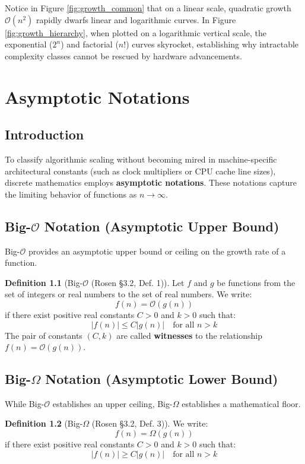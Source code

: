 \documentclass[11pt,a4paper,oneside]{report}
\theoremstyle{definition}
\newtheorem{definition}{Definition}[chapter]
\begin{document}
Notice in Figure \ref{fig:growth_common} that on a linear scale, quadratic growth $\mathcal{O}(n^2)$ rapidly dwarfs linear and logarithmic curves. In Figure \ref{fig:growth_hierarchy}, when plotted on a logarithmic vertical scale, the exponential ($2^n$) and factorial ($n!$) curves skyrocket, establishing why intractable complexity classes cannot be rescued by hardware advancements.

\chapter{Asymptotic Notations}
\label{chap:asymptotic}

\section{Introduction}
To classify algorithmic scaling without becoming mired in machine-specific architectural constants (such as clock multipliers or CPU cache line sizes), discrete mathematics employs \textbf{asymptotic notations}. These notations capture the limiting behavior of functions as $n \to \infty$.

\section{Big-$\mathcal{O}$ Notation (Asymptotic Upper Bound)}
Big-$\mathcal{O}$ provides an asymptotic upper bound or ceiling on the growth rate of a function.

\begin{definition}[Big-$\mathcal{O}$ (Rosen §3.2, Def. 1)]
Let $f$ and $g$ be functions from the set of integers or real numbers to the set of real numbers. We write:
$$f(n) = \mathcal{O}(g(n))$$
if there exist positive real constants $C > 0$ and $k > 0$ such that:
$$|f(n)| \le C |g(n)| \quad \text{for all } n > k$$
The pair of constants $(C, k)$ are called \textbf{witnesses} to the relationship $f(n) = \mathcal{O}(g(n))$.
\end{definition}

\section{Big-$\Omega$ Notation (Asymptotic Lower Bound)}
While Big-$\mathcal{O}$ establishes an upper ceiling, Big-$\Omega$ establishes a mathematical floor.

\begin{definition}[Big-$\Omega$ (Rosen §3.2, Def. 3)]
We write:
$$f(n) = \Omega(g(n))$$
if there exist positive real constants $C > 0$ and $k > 0$ such that:
$$|f(n)| \ge C |g(n)| \quad \text{for all } n > k$$
\end{definition}
\end{document}
